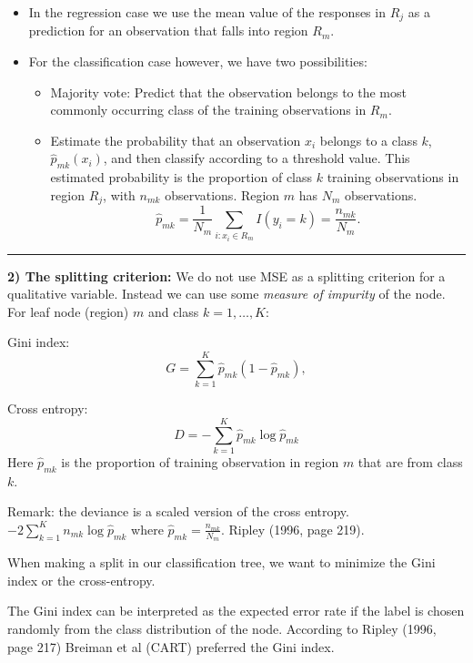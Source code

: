 \documentclass[
  letterpaper,
  DIV=11,
  numbers=noendperiod]{scrartcl}
\providecommand{\tightlist}{%
  \setlength{\itemsep}{0pt}\setlength{\parskip}{0pt}}\usepackage{longtable,booktabs,array}
\begin{document}
\begin{itemize}
\tightlist
\item
  In the regression case we use the mean value of the responses in
  \(R_j\) as a prediction for an observation that falls into region
  \(R_m\).
\item
  For the classification case however, we have two possibilities:

  \begin{itemize}
  \tightlist
  \item
    Majority vote: Predict that the observation belongs to the most
    commonly occurring class of the training observations in \(R_m\).\\
  \item
    Estimate the probability that an observation \(x_i\) belongs to a
    class \(k\), \(\hat{p}_{mk}(x_i)\), and then classify according to a
    threshold value. This estimated probability is the proportion of
    class \(k\) training observations in region \(R_j\), with \(n_{mk}\)
    observations. Region \(m\) has \(N_m\) observations.
    \[\hat{p}_{mk} = \frac{1}{N_m} \sum_{i:x_i \in R_m} I(y_i = k)=\frac{n_{mk}}{N_m}.\]
  \end{itemize}
\end{itemize}

\begin{center}\rule{0.5\linewidth}{0.5pt}\end{center}

\textbf{2) The splitting criterion:} We do not use MSE as a splitting
criterion for a qualitative variable. Instead we can use some
\emph{measure of impurity} of the node. For leaf node (region) \(m\) and
class \(k=1,\ldots, K\):

Gini index: \[
G=\sum_{k=1}^K \hat{p}_{mk}(1-\hat{p}_{mk}),
\]

Cross entropy: \[
D=-\sum_{k=1}^K \hat{p}_{mk}\log\hat{p}_{mk}
\] Here \(\hat{p}_{mk}\) is the proportion of training observation in
region \(m\) that are from class \(k\).

Remark: the deviance is a scaled version of the cross entropy.
\(-2\sum_{k=1}^K n_{mk} \log\hat{p}_{mk}\) where
\(\hat{p}_{mk}=\frac{n_{mk}}{N_m}\). Ripley (1996, page 219).

When making a split in our classification tree, we want to minimize the
Gini index or the cross-entropy.

The Gini index can be interpreted as the expected error rate if the
label is chosen randomly from the class distribution of the node.
According to Ripley (1996, page 217) Breiman et al (CART) preferred the
Gini index.
\end{document}
